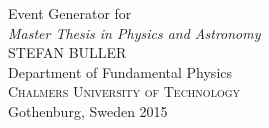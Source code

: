 \begin{titlepage}
\mbox{}
\vfill
\addtolength{\voffset}{2cm}
\begin{flushleft}
	{\noindent \LARGE{Event Generator for \rtb{}} \\[0.3cm]
	\emph{\Large Master Thesis in Physics and Astronomy} \\[.8cm]
	
	\Large{STEFAN BULLER}\\[.8cm]
	
	{\Large Department of Fundamental Physics \\
	\textsc{Chalmers University of Technology} \\
	Gothenburg, Sweden 2015 \\
	} 
	}
\end{flushleft}
\end{titlepage}
\ClearShipoutPicture
\pagestyle{empty}
\clearpage
\mbox{}
\clearpage
\thispagestyle{empty}

